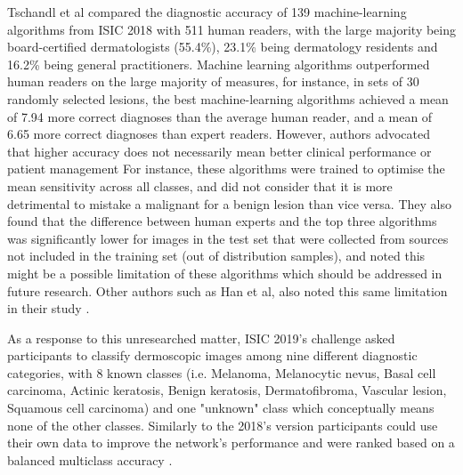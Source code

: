     Tschandl et al \cite{humanvsisic2018} compared the diagnostic accuracy of 139 machine-learning algorithms from ISIC 2018 with 511 human readers, with the large majority being board-certified dermatologists (55.4\%), 23.1\% being dermatology residents and 16.2\% being general practitioners. Machine learning algorithms outperformed human readers on the large majority of measures, for instance, in sets of 30 randomly selected lesions, the best machine-learning algorithms achieved a mean of 7.94 more correct diagnoses than the average human reader, and a mean of 6.65 more correct diagnoses than expert readers. However, authors advocated that higher accuracy does not necessarily mean better clinical performance or patient management For instance, these algorithms were trained to optimise the mean sensitivity across all classes, and did not consider that it is more detrimental to mistake a malignant for a benign lesion than vice versa. They also found that the difference between human experts and the top three algorithms was significantly lower for images in the test set that were collected from sources not included in the training set (out of distribution samples), and noted this might be a possible limitation of these algorithms which should be addressed in future research. Other authors such as Han et al, also noted this same limitation in their study \cite{Han2018}. \par 
    
    As a response to this unresearched matter, ISIC 2019's challenge asked participants to classify dermoscopic images among nine different diagnostic categories, with 8 known classes (i.e. Melanoma, Melanocytic nevus, Basal cell carcinoma, Actinic keratosis, Benign keratosis, Dermatofibroma, Vascular lesion, Squamous cell carcinoma) and one "unknown" class which conceptually means none of the other classes. Similarly to the 2018's version participants could use their own data to improve the network's performance and were ranked based on a balanced multiclass accuracy \cite{isic2019}. \par
    
